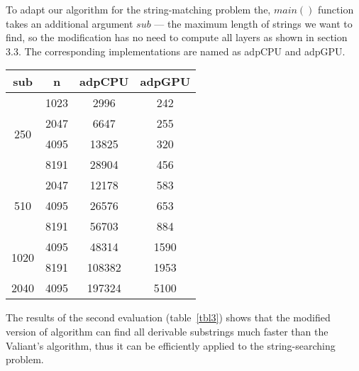 To adapt our algorithm for the string-matching problem the, $main()$ function takes an additional argument $sub$ --- the maximum length of strings we want to find, so the modification has no need to compute all layers as shown in section 3.3.
The corresponding implementations are named as \textsf{adpCPU} and \textsf{adpGPU}.

\begin{table*}

\begin{center}
\caption{Modified algorithm evaluation on the string-searching for the $BIO$ grammar}
\label{tbl3}
    \begin{tabular}{ ||c||c||c|c|| } 
    \hline 
     sub & n & adpCPU &  adpGPU \\
    \hline
    \multirow{4}{1.5em}{250} & 1023 & 2996 & 242 \\ 
    & 2047 & 6647 & 255\\ 
    & 4095 & 13825 & 320\\ 
    & 8191 & 28904 & 456\\ 
    \hline
    \multirow{3}{1.5em}{510} & 2047 & 12178 & 583\\
    & 4095 & 26576 & 653\\
    & 8191 & 56703 & 884\\ 
    \hline
    \multirow{2}{2em}{1020} & 4095 & 48314 & 1590 \\
    & 8191 & 108382 & 1953\\ 
    \hline
    2040 & 4095 & 197324 & 5100\\ 
    \hline
    \end{tabular}
\end{center}

\end{table*}

The results of the second evaluation (table~\ref{tbl3}) shows that the modified version of algorithm can find all derivable substrings much faster than the Valiant's algorithm, thus it can be efficiently applied to the string-searching problem.